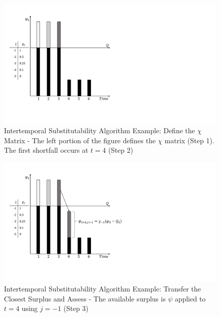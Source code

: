 \documentclass[preprint,12pt]{elsarticle}
\begin{document}
 
\begin{figure}[h]
  \centering\includegraphics[width=\textwidth]{Chi2-1.pdf}
  \caption{Intertemporal Substitutability Algorithm Example: Define
    the $\chi$ Matrix - The left portion of the figure defines
    the $\chi$ matrix (Step 1). The first shortfall occurs at
    $t=4$ (Step 2)}
  \label{f:Chi2-1}
\end{figure}


\begin{figure}[h]
  \centering\includegraphics[width=\textwidth]{Chi2-2.pdf}
  \caption{Intertemporal Substitutability Algorithm Example: Transfer
    the Closest Surplus and Assess - The available surplus is $\psi$
    applied to $t=4$ using $j={-1}$ (Step 3)}
  \label{f:Chi2-2}
\end{figure}
\end{document}
